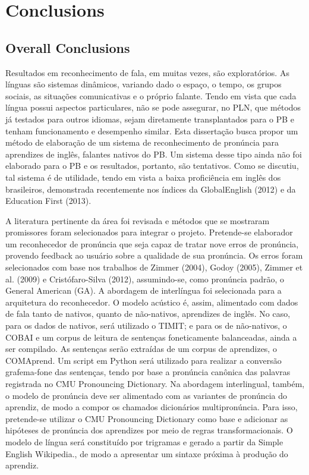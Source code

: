 \chapter{Conclusions}\label{ch:conclusions}

\section*{Overall Conclusions}\label{sec:overall-conclusions}

Resultados em reconhecimento de fala, em muitas vezes, s\~ao
explorat\'orios. As l\'inguas s\~ao sistemas din\^amicos, variando dado o
espa\c{c}o, o tempo, os grupos sociais, as situa\c{c}\~oes comunicativas e o
pr\'oprio falante. Tendo em vista que cada l\'ingua possui aspectos
particulares, n\~ao se pode assegurar, no PLN, que m\'etodos j\'a testados
para outros idiomas, sejam diretamente transplantados para o PB e tenham
funcionamento e desempenho similar. Esta disserta\c{c}\~ao busca propor um
m\'etodo de elabora\c{c}\~ao de um sistema de reconhecimento de pron\'uncia para
aprendizes de ingl\^es, falantes nativos do PB. Um sistema desse tipo
ainda n\~ao foi elaborado para o PB e os resultados, portanto, s\~ao
tentativos. Como se discutiu, tal sistema \'e de utilidade, tendo em vista
a baixa profici\^encia em ingl\^es dos brasileiros, demonstrada recentemente
nos \'indices da GlobalEnglish (2012) e da Education First (2013).

A literatura pertinente da \'area foi revisada e m\'etodos que se mostraram
promissores foram selecionados para integrar o projeto. Pretende-se
elaborador um reconhecedor de pron\'uncia que seja capaz de tratar nove
erros de pron\'uncia, provendo feedback ao usu\'ario sobre a qualidade de
sua pron\'uncia. Os erros foram selecionados com base nos trabalhos de
Zimmer (2004), Godoy (2005), Zimmer et al. (2009) e Crist\'ofaro-Silva
(2012), assumindo-se, como pron\'uncia padr\~ao, o General American (GA). A
abordagem de interl\'ingua foi selecionada para a arquitetura do
reconhecedor. O modelo ac\'ustico \'e, assim, alimentado com dados de fala
tanto de nativos, quanto de n\~ao-nativos, aprendizes de ingl\^es. No caso,
para os dados de nativos, ser\'a utilizado o TIMIT; e para os de
n\~ao-nativos, o COBAI e um corpus de leitura de senten\c{c}as foneticamente
balanceadas, ainda a ser compilado. As senten\c{c}as ser\~ao extra\'idas de um
corpus de aprendizes, o COMAprend. Um script em Python ser\'a utilizado
para realizar a convers\~ao grafema-fone das senten\c{c}as, tendo por base a
pron\'uncia can\^onica das palavras registrada no CMU Pronouncing
Dictionary. Na abordagem interlingual, tamb\'em, o modelo de pron\'uncia
deve ser alimentado com as variantes de pron\'uncia do aprendiz, de modo a
compor os chamados dicion\'arios multipron\'uncia. Para isso, pretende-se
utilizar o CMU Pronouncing Dictionary como base e adicionar as hip\'oteses
de pron\'uncia dos aprendizes por meio de regras transformacionais. O
modelo de l\'ingua ser\'a constitu\'ido por trigramas e gerado a partir da
Simple English Wikipedia., de modo a apresentar um sintaxe pr\'oxima à
produ\c{c}\~ao do aprendiz.

